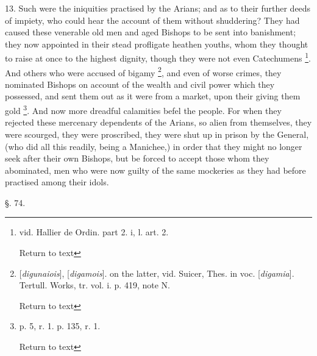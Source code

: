 13. Such were the iniquities practised by the
Arians; and as to their further deeds of impiety, who could hear the
account of them without shuddering? They had caused these venerable
old men and aged Bishops to be sent into banishment; they now
appointed in their stead profligate heathen youths, whom they thought
to raise at once to the highest dignity, though they were not even
Catechumens \footnote{vid. Hallier de Ordin. part 2. i, l. art. 2.

Return to text}. And others who were accused of bigamy
\footnote{[\emph{digunaiois}], [\emph{digamois}]. on the
latter, vid. Suicer, Thes. in voc. [\emph{digamia}]. Tertull. Works,
tr. vol. i. p. 419, note N.

Return to text},
and even of worse crimes, they nominated Bishops on account of the
wealth and civil power which they possessed, and sent them out as it
were from a market, upon their giving them gold \footnote{p. 5, r. 1. p. 135, r. 1.

Return to text}. And now
more dreadful calamities befel the people. For when they rejected
these mercenary dependents of the Arians, so alien from themselves,
they were scourged, they were proscribed, they were shut up in prison
by the General, (who did all this readily, being a Manichee,) in order
that they might no longer seek after their own Bishops, but be forced
to accept those whom they abominated, men who were now guilty of the
same mockeries as they had before practised among their idols.

§. 74.


